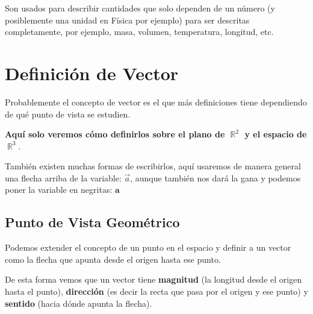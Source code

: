 \documentclass[12pt, fleqn]{report}                             %
\DeclareMathOperator \Reals        {\mathbb{R}}                 %
\newcommand{\bVec}[1]{\mathbf{#1}}                              %
\begin{document}
            Son usados para describir cantidades que solo dependen de un número (y posiblemente una
            unidad en Física por ejemplo) para ser descritas completamente, por ejemplo, masa,
            volumen, temperatura, longitud, etc.


        \vspace{1em}
        \section{Definición de Vector}
        
            Probablemente el concepto de vector es el que más definiciones tiene dependiendo de qué
            punto de vista se estudien.

            \textbf{Aquí solo veremos cómo definirlos sobre el plano de $\Reals^2$ y el espacio de $\Reals^3$}.

            También existen muchas formas de escribirlos, aquí usaremos de manera general una flecha
            arriba de la variable: $\vec{a}$, aunque también nos dará la gana y podemos poner la
            variable en negritas: $\bVec{a}$

            \subsection{Punto de Vista Geométrico}
            
                Podemos extender el concepto de un punto en el espacio y definir a un vector
                como la flecha que apunta desde el origen hasta ese punto.

                De esta forma vemos que un vector tiene \textbf{magnitud} (la longitud desde
                el origen hasta el punto), \textbf{dirección} (es decir la recta que pasa por
                el origen y ese punto) y \textbf{sentido} (hacia dónde apunta la flecha).
                
\end{document}
